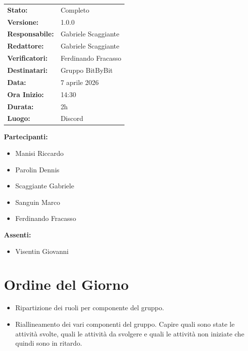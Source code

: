 \documentclass[a4paper,12pt]{article}
\begin{document}
\begin{tcolorbox}
\begin{tabularx}{\textwidth}{@{}l X@{}}
\textbf{Stato:} & Completo\\
\textbf{Versione:} & 1.0.0\\
\textbf{Responsabile:} & Gabriele Scaggiante\\
\textbf{Redattore:} & Gabriele Scaggiante \\
\textbf{Verificatori:} & Ferdinando Fracasso\\
\textbf{Destinatari:} & Gruppo BitByBit\\
\textbf{Data:} & 7 aprile 2026 \\
\textbf{Ora Inizio:} & 14:30 \\
\textbf{Durata:} & 2h \\
\textbf{Luogo:} & Discord \\
\end{tabularx}
\end{tcolorbox}

\vspace{0.4cm}
\textbf{Partecipanti:}
\begin{itemize}
    \item Manisi Riccardo
    \item Parolin Dennis
    \item Scaggiante Gabriele
    \item Sanguin Marco
    \item Ferdinando Fracasso
\end{itemize}

\textbf{Assenti:}
\begin{itemize}
    \item Visentin Giovanni
\end{itemize}

\clearpage

\vspace{0.5cm}

\vspace{0.8cm}

\clearpage
\tableofcontents
\thispagestyle{empty} %
\clearpage

\section{Ordine del Giorno}
\begin{itemize}
    \item Ripartizione dei ruoli per componente del gruppo.
    \item Riallineamento dei vari componenti del gruppo. Capire quali sono state le attività svolte, quali le attività da svolgere e quali le attività non iniziate che quindi sono in ritardo.
\end{itemize}
\end{document}
